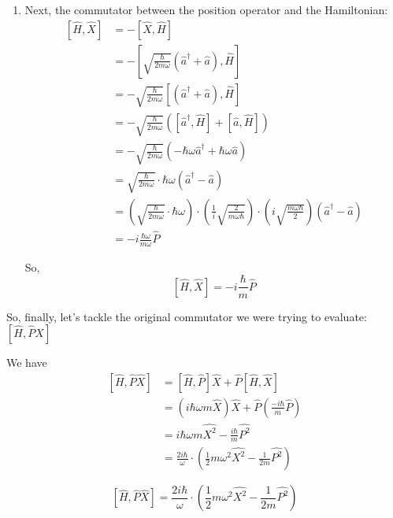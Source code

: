 \documentclass[twoside]{article}
\begin{document}
\begin{enumerate}
\begin{enumerate}
      \item Next, the commutator between the position operator and the Hamiltonian:
      \begin{align*}
         \left[ \hat{H}, \hat{X} \right] &= - \left[ \hat{X}, \hat{H} \right] \\
         &= -\left[ \sqrt{\frac{\hbar}{2 m \omega}} \left( \hat{a}^{\dagger} + \hat{a} \right) , \hat{H} \right] \\
         &= -\sqrt{\frac{\hbar}{2 m \omega}} \left[ \left( \hat{a}^{\dagger} + \hat{a} \right) , \hat{H} \right] \\
         &= -\sqrt{\frac{\hbar}{2 m \omega}} \left( \left[ \hat{a}^{\dagger}, \hat{H} \right] + \left[ \hat{a}, \hat{H} \right] \right) \\
         &= -\sqrt{\frac{\hbar}{2m\omega}} \left(- \hbar\omega \hat{a}^{\dagger} + \hbar\omega \hat{a} \right) \\ 
         &= \sqrt{\frac{\hbar}{2m\omega}} \cdot \hbar\omega \left( \hat{a}^{\dagger} - \hat{a} \right) \\
         &= \left( \sqrt{\frac{\hbar}{2m\omega}} \cdot \hbar\omega \right) \cdot \left(\frac{1}{i} \sqrt{\frac{2}{m\omega\hbar}}\right) \cdot \left(i\sqrt{\frac{m\omega\hbar}{2}}\right) \left( \hat{a}^{\dagger} - \hat{a} \right) \\
         &= -i \frac{\hbar\omega}{m\omega} \hat{P}
      \end{align*}

      So, 
      \[ \boxed{\left[ \hat{H}, \hat{X} \right] = -i \frac{\hbar}{m} \hat{P}} \]
   \end{enumerate}

   So, finally, let's tackle the original commutator we were trying to evaluate: $\left[ \hat{H}, \hat{P}\hat{X} \right]$

   We have 
   \begin{align*}
      \left[ \hat{H}, \hat{P}\hat{X} \right] &= \left[ \hat{H}, \hat{P} \right] \hat{X} + \hat{P} \left[ \hat{H}, \hat{X} \right] \\
      &= \left(i \hbar\omega m \hat{X}\right) \hat{X} + \hat{P} \left( \frac{-i\hbar}{m} \hat{P} \right) \\
      &= i\hbar\omega m \hat{X^2} - \frac{i\hbar}{m} \hat{P^2} \\
      &= \frac{2 i \hbar}{\omega} \cdot \left( \frac{1}{2} m \omega^2 \hat{X^2} - \frac{1}{2m} \hat{P^2} \right)
   \end{align*}

   \[ \boxed{\left[ \hat{H}, \hat{P}\hat{X} \right] = \frac{2 i \hbar}{\omega} \cdot \left( \frac{1}{2} m \omega^2 \hat{X^2} - \frac{1}{2m} \hat{P^2} \right)} \]
   \vskip 1cm


\end{enumerate}
\end{document}
